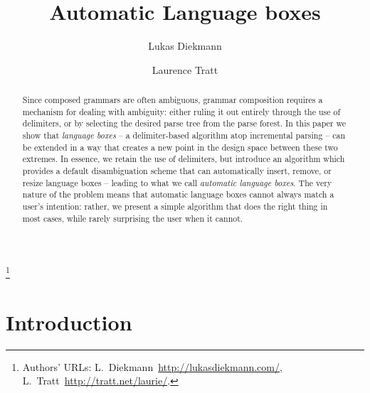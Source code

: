 \documentclass[sigplan,screen]{acmart}\settopmatter{printfolios=true,printccs=false,printacmref=false}
\begin{document}
\title{Automatic Language boxes}

\author{Lukas Diekmann}
\author{Laurence Tratt}
\thanks{Authors' URLs: %
    L.~Diekmann~\url{http://lukasdiekmann.com/},
    L.~Tratt~\url{http://tratt.net/laurie/}.
}


\begin{abstract}
Since composed grammars are often ambiguous, grammar composition requires a
mechanism for dealing with ambiguity: either ruling it out entirely through the use of
delimiters, or by selecting the desired parse tree from the parse forest.  In
this paper we show that \emph{language boxes} -- a delimiter-based
algorithm atop incremental parsing -- can be extended in a way that creates
a new point in the design space between these two extremes. In essence, we
retain the use of delimiters, but
introduce an algorithm which provides a default disambiguation scheme that
can automatically insert, remove, or resize
language boxes -- leading to what we call \emph{automatic language
boxes}. The very nature of the problem means that automatic language boxes
cannot always match a user's intention: rather, we present a simple
algorithm that does the right thing in most cases, while rarely surprising the
user when it cannot.
\end{abstract}


\maketitle

\section{Introduction}
\end{document}
